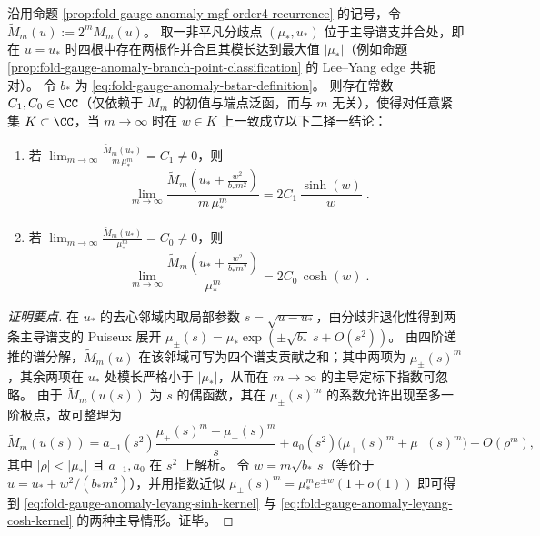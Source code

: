\begin{theorem}\label{thm:fold-gauge-anomaly-leyang-universal-kernels}
沿用命题 \ref{prop:fold-gauge-anomaly-mgf-order4-recurrence} 的记号，令 \(\widetilde M_m(u):=2^mM_m(u)\)。
取一非平凡分歧点 \((\mu_\ast,u_\ast)\) 位于主导谱支并合处，即在 \(u=u_\ast\) 时四根中存在两根作并合且其模长达到最大值 \(|\mu_\ast|\)（例如命题 \ref{prop:fold-gauge-anomaly-branch-point-classification} 的 Lee--Yang edge 共轭对）。
令 \(b_\ast\) 为 \eqref{eq:fold-gauge-anomaly-bstar-definition}。
则存在常数 \(C_1,C_0\in\CC\)（仅依赖于 \(\widetilde M_m\) 的初值与端点泛函，而与 \(m\) 无关），使得对任意紧集 \(K\subset\CC\)，当 \(m\to\infty\) 时在 \(w\in K\) 上一致成立以下二择一结论：
\begin{enumerate}
  \item 若 \(\displaystyle \lim_{m\to\infty}\frac{\widetilde M_m(u_\ast)}{m\,\mu_\ast^{m}}=C_1\neq 0\)，则
  \begin{equation}\label{eq:fold-gauge-anomaly-leyang-sinh-kernel}
  \boxed{\;
  \lim_{m\to\infty}\frac{\widetilde M_m\!\left(u_\ast+\frac{w^2}{b_\ast m^2}\right)}{m\,\mu_\ast^{m}}
  =2C_1\,\frac{\sinh(w)}{w}\; }.
  \end{equation}
  \item 若 \(\displaystyle \lim_{m\to\infty}\frac{\widetilde M_m(u_\ast)}{\mu_\ast^{m}}=C_0\neq 0\)，则
  \begin{equation}\label{eq:fold-gauge-anomaly-leyang-cosh-kernel}
  \boxed{\;
  \lim_{m\to\infty}\frac{\widetilde M_m\!\left(u_\ast+\frac{w^2}{b_\ast m^2}\right)}{\mu_\ast^{m}}
  =2C_0\,\cosh(w)\; }.
  \end{equation}
\end{enumerate}
\end{theorem}
\begin{proof}[证明要点]
在 \(u_\ast\) 的去心邻域内取局部参数 \(s=\sqrt{u-u_\ast}\)，由分歧非退化性得到两条主导谱支的 Puiseux 展开
\(
\mu_\pm(s)=\mu_\ast\exp(\pm \sqrt{b_\ast}\,s+O(s^2))
\)。
由四阶递推的谱分解，\(\widetilde M_m(u)\) 在该邻域可写为四个谱支贡献之和；其中两项为 \(\mu_\pm(s)^m\)，其余两项在 \(u_\ast\) 处模长严格小于 \(|\mu_\ast|\)，从而在 \(m\to\infty\) 的主导定标下指数可忽略。
由于 \(\widetilde M_m(u(s))\) 为 \(s\) 的偶函数，其在 \(\mu_\pm(s)^m\) 的系数允许出现至多一阶极点，故可整理为
\[
\widetilde M_m(u(s))
=a_{-1}(s^2)\frac{\mu_+(s)^m-\mu_-(s)^m}{s}
+a_0(s^2)\bigl(\mu_+(s)^m+\mu_-(s)^m\bigr)
+O(\rho^m),
\]
其中 \(|\rho|<|\mu_\ast|\) 且 \(a_{-1},a_0\) 在 \(s^2\) 上解析。
令 \(w=m\sqrt{b_\ast}\,s\)（等价于 \(u=u_\ast+w^2/(b_\ast m^2)\)），并用指数近似
\(
\mu_\pm(s)^m=\mu_\ast^m e^{\pm w}(1+o(1))
\)
即可得到 \eqref{eq:fold-gauge-anomaly-leyang-sinh-kernel} 与 \eqref{eq:fold-gauge-anomaly-leyang-cosh-kernel} 的两种主导情形。证毕。
\end{proof}

